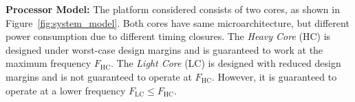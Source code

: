 

\noindent\textbf{Processor Model: }The platform considered consists of two cores, as shown in Figure~\ref{fig:system_model}. Both cores have same microarchitecture, but different power consumption due to different timing closures. The \textit{Heavy Core} (HC) is designed under worst-case design margins and is guaranteed to work at the maximum frequency $F_{\mathrm{HC}}$. The \textit{Light Core} (LC) is designed with reduced design margins and is not guaranteed to operate at $F_\mathrm{HC}$. However, it is guaranteed to operate at a lower frequency $F_{\mathrm{LC}}\leq F_{\mathrm{HC}}$. 


